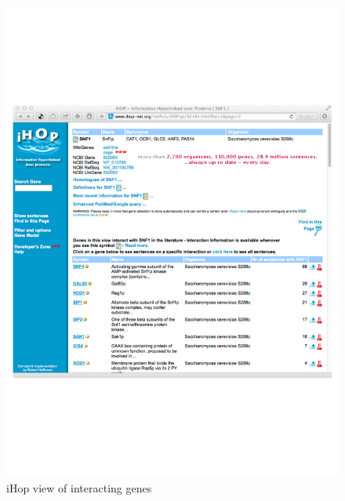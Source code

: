 \begin{figure}
\begin{center}
\includegraphics[scale=0.6]{figures/ihop-1.pdf}
 \caption{iHop view of interacting genes }
\label{fig:ihop-1}
\end{center}
\end{figure}    

